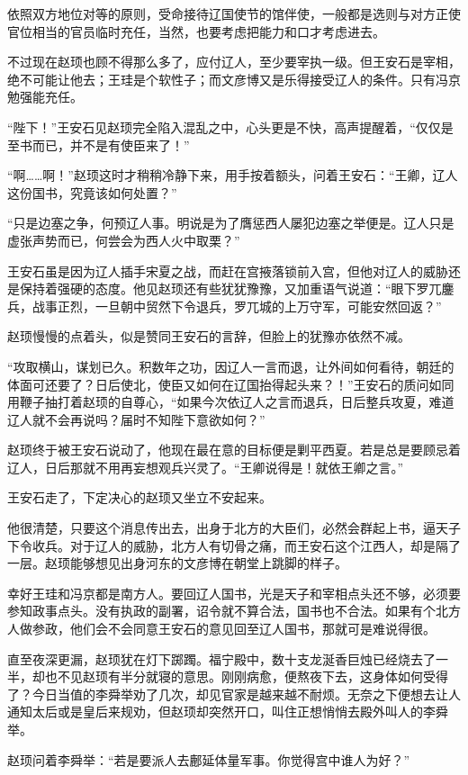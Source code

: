 依照双方地位对等的原则，受命接待辽国使节的馆伴使，一般都是选则与对方正使官位相当的官员临时充任，当然，也要考虑把能力和口才考虑进去。

不过现在赵顼也顾不得那么多了，应付辽人，至少要宰执一级。但王安石是宰相，绝不可能让他去；王珪是个软性子；而文彦博又是乐得接受辽人的条件。只有冯京勉强能充任。

“陛下！”王安石见赵顼完全陷入混乱之中，心头更是不快，高声提醒着，“仅仅是至书而已，并不是有使臣来了！”

“啊……啊！”赵顼这时才稍稍冷静下来，用手按着额头，问着王安石：“王卿，辽人这份国书，究竟该如何处置？”

“只是边塞之争，何预辽人事。明说是为了膺惩西人屡犯边塞之举便是。辽人只是虚张声势而已，何尝会为西人火中取栗？”

王安石虽是因为辽人插手宋夏之战，而赶在宫掖落锁前入宫，但他对辽人的威胁还是保持着强硬的态度。他见赵顼还有些犹犹豫豫，又加重语气说道：“眼下罗兀鏖兵，战事正烈，一旦朝中贸然下令退兵，罗兀城的上万守军，可能安然回返？”

赵顼慢慢的点着头，似是赞同王安石的言辞，但脸上的犹豫亦依然不减。

“攻取横山，谋划已久。积数年之功，因辽人一言而退，让外间如何看待，朝廷的体面可还要了？日后使北，使臣又如何在辽国抬得起头来？！”王安石的质问如同用鞭子抽打着赵顼的自尊心，“如果今次依辽人之言而退兵，日后整兵攻夏，难道辽人就不会再说吗？届时不知陛下意欲如何？”

赵顼终于被王安石说动了，他现在最在意的目标便是剿平西夏。若是总是要顾忌着辽人，日后那就不用再妄想观兵兴灵了。“王卿说得是！就依王卿之言。”

王安石走了，下定决心的赵顼又坐立不安起来。

他很清楚，只要这个消息传出去，出身于北方的大臣们，必然会群起上书，逼天子下令收兵。对于辽人的威胁，北方人有切骨之痛，而王安石这个江西人，却是隔了一层。赵顼能够想见出身河东的文彦博在朝堂上跳脚的样子。

幸好王珪和冯京都是南方人。要回辽人国书，光是天子和宰相点头还不够，必须要参知政事点头。没有执政的副署，诏令就不算合法，国书也不合法。如果有个北方人做参政，他们会不会同意王安石的意见回至辽人国书，那就可是难说得很。

直至夜深更漏，赵顼犹在灯下踯躅。福宁殿中，数十支龙涎香巨烛已经烧去了一半，却也不见赵顼有半分就寝的意思。刚刚病愈，便熬夜下去，这身体如何受得了？今日当值的李舜举劝了几次，却见官家是越来越不耐烦。无奈之下便想去让人通知太后或是皇后来规劝，但赵顼却突然开口，叫住正想悄悄去殿外叫人的李舜举。

赵顼问着李舜举：“若是要派人去鄜延体量军事。你觉得宫中谁人为好？”


